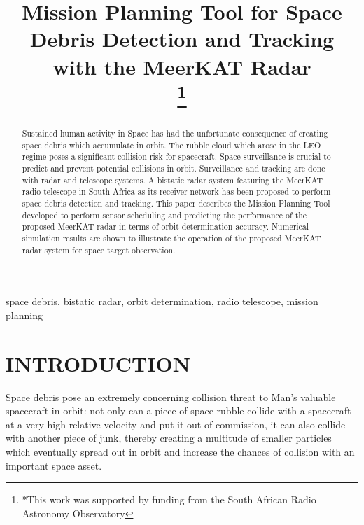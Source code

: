 \documentclass[conference]{IEEEtran}
\begin{document}
\title{Mission Planning Tool for Space Debris Detection and Tracking with the MeerKAT Radar\\
\thanks{*This work was supported by funding from the South African Radio Astronomy Observatory}
}

\author{
}

\maketitle

\begin{abstract}
Sustained human activity in Space has had the unfortunate consequence of creating space debris which accumulate in orbit. The rubble cloud which arose in the LEO regime poses a significant collision risk for spacecraft. Space surveillance is crucial to predict and prevent potential collisions in orbit. Surveillance and tracking are done with radar and telescope systems. A bistatic radar system featuring the MeerKAT radio telescope in South Africa as its receiver network has been proposed to perform space debris detection and tracking. This paper describes the Mission Planning Tool developed to perform sensor scheduling and predicting the performance of the proposed MeerKAT radar in terms of orbit determination accuracy. Numerical simulation results are shown to illustrate the operation of the proposed MeerKAT radar system for space target observation.
\end{abstract}

\begin{IEEEkeywords}
space debris, bistatic radar, orbit determination, radio telescope, mission planning
\end{IEEEkeywords}

\section{INTRODUCTION}
Space debris pose an extremely concerning collision threat to Man's valuable spacecraft in orbit: not only can a piece of space rubble collide with a spacecraft at a very high relative velocity and put it out of commission, it can also collide with another piece of junk, thereby creating a multitude of smaller particles which eventually spread out in orbit and increase the chances of collision with an important space asset.
\end{document}

